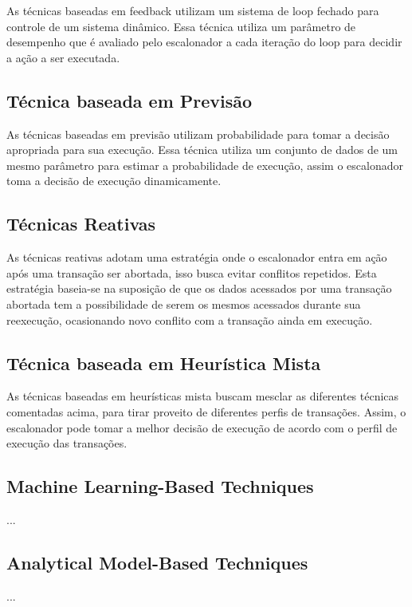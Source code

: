 \documentclass[ti]{texufpel} %
\begin{document}
As técnicas baseadas em feedback utilizam um sistema de loop fechado para controle de um sistema dinâmico. Essa técnica utiliza um parâmetro de desempenho que é avaliado pelo escalonador a cada iteração do loop para decidir a ação a ser executada.

\subsection{Técnica baseada em Previsão}

As técnicas baseadas em previsão utilizam probabilidade para tomar a decisão apropriada para sua execução. Essa técnica utiliza um conjunto de dados de um mesmo parâmetro para estimar a probabilidade de execução, assim o escalonador toma a decisão de execução dinamicamente.

\subsection{Técnicas Reativas}

As técnicas reativas adotam uma estratégia onde o escalonador entra em ação após uma transação ser abortada, isso busca evitar conflitos repetidos. Esta estratégia baseia-se na suposição de que os dados acessados por uma transação abortada tem a possibilidade de serem os mesmos acessados durante sua reexecução, ocasionando novo conflito com a transação ainda em execução.

\subsection{Técnica baseada em Heurística Mista}

As técnicas baseadas em heurísticas mista buscam mesclar as diferentes técnicas comentadas acima, para tirar proveito de diferentes perfis de transações. Assim, o escalonador pode tomar a melhor decisão de execução de acordo com o perfil de execução das transações.

\subsection{Machine Learning-Based Techniques}

...

\subsection{Analytical Model-Based Techniques}

...
\end{document}
